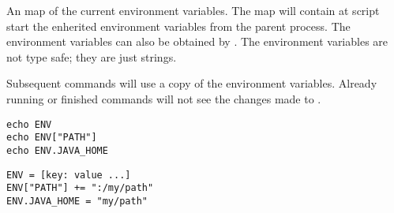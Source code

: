 %

An map of the current environment variables. The map will contain
at script start the enherited environment variables from the parent process.
The environment variables can also be obtained by \cite{getenv13}.
The environment variables are not type safe; they are just strings.

Subsequent commands will use a copy of the environment variables. 
Already running or finished commands will not see the changes
made to .

\begin{lstlisting}[style=Groovybash, label={lst:example_args}, title={
Print the current environment variables.}]
echo ENV
echo ENV["PATH"]
echo ENV.JAVA_HOME
\end{lstlisting}

\begin{lstlisting}[style=Groovybash, label={lst:example_args}, title={
Set environment variables to new value.}]
ENV = [key: value ...]
ENV["PATH"] += ":/my/path"
ENV.JAVA_HOME = "my/path"
\end{lstlisting}

